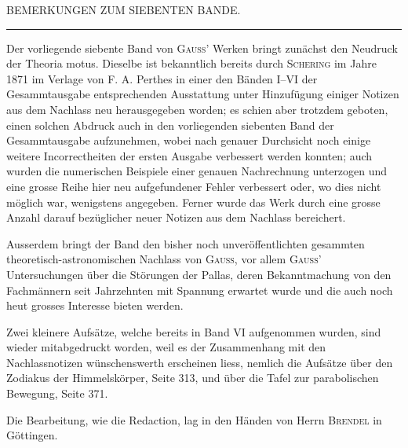 \clearpage
\begingroup
{}
\renewcommand{\headrulewidth}{0pt}
\begin{center}\large BEMERKUNGEN ZUM SIEBENTEN BANDE.\end{center}
\begin{center}\rule{.09\linewidth}{.4pt}\end{center}

\par\noindent\hspace*{\parindent}Der vorliegende siebente Band von \textsc{Gauss}’ Werken bringt zunächst den Neudruck der Theoria motus.
Dieselbe ist bekanntlich bereits durch \textsc{Schering} im Jahre 1871 im Verlage von F. A. Perthes in einer den
Bänden I--VI der Gesammtausgabe entsprechenden Ausstattung unter Hinzufügung einiger Notizen aus dem
Nachlass neu herausgegeben worden; es schien aber trotzdem geboten, einen solchen Abdruck auch in den
vorliegenden siebenten Band der Gesammtausgabe aufzunehmen, wobei nach genauer Durchsicht noch einige
weitere Incorrectheiten der ersten Ausgabe verbessert werden konnten; auch wurden die numerischen Beispiele
einer genauen Nachrechnung unterzogen und eine grosse Reihe hier neu aufgefundener Fehler verbessert
oder, wo dies nicht möglich war, wenigstens angegeben. Ferner wurde das Werk durch eine
grosse Anzahl darauf bezüglicher neuer Notizen aus dem Nachlass bereichert.

\par\noindent\hspace*{\parindent}Ausserdem bringt der Band den bisher noch unveröffentlichten gesammten theoretisch-astronomischen
Nachlass von \textsc{Gauss}, vor allem \textsc{Gauss}’ Untersuchungen über die Störungen der Pallas, deren Bekanntmachung
von den Fachmännern seit Jahrzehnten mit Spannung erwartet wurde und die auch noch heut
grosses Interesse bieten werden.

\par\noindent\hspace*{\parindent}Zwei kleinere Aufsätze, welche bereits in Band VI aufgenommen wurden, sind wieder mitabgedruckt
worden, weil es der Zusammenhang mit den Nachlassnotizen wünschenswerth erscheinen liess, nemlich die
Aufsätze über den Zodiakus der Himmelskörper, Seite 313, und über die Tafel zur parabolischen Bewegung,
Seite 371.

\par\noindent\hspace*{\parindent}Die Bearbeitung, wie die Redaction, lag in den Händen von Herrn \textsc{Brendel} in Göttingen.

